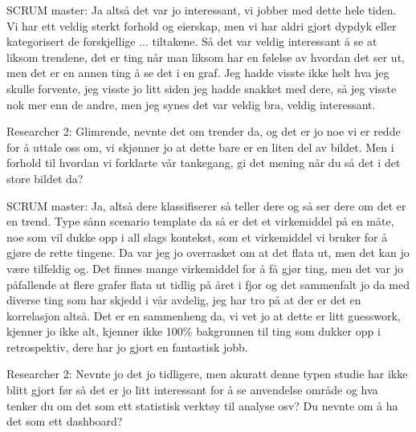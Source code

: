 SCRUM master: Ja altså det var jo interessant, vi jobber med dette hele tiden. Vi har ett veldig sterkt forhold og eierskap, men vi har aldri gjort dypdyk eller kategorisert de forskjellige ... tiltakene. Så det var veldig interessant å se  at liksom trendene, det er ting når man liksom har en følelse av hvordan det ser ut, men det er en annen ting å se det i en graf. Jeg hadde visste ikke helt hva jeg skulle forvente, jeg visste jo litt siden jeg hadde snakket med dere, så jeg visste nok mer enn de andre, men jeg synes det var veldig bra, veldig interessant.

Researcher 2: Glimrende, nevnte det om trender da, og det er jo noe vi er redde for å uttale oss om, vi skjønner jo at dette bare er en liten del av bildet. Men i forhold til hvordan vi forklarte vår tankegang, gi det mening når du så det i det store bildet da?

SCRUM master: Ja, altså dere klassifiserer så teller dere og så ser dere om det er en trend. Type sånn scenario template da så er det et virkemiddel på en måte, noe som vil dukke opp i all slags kontekst, som et virkemiddel vi bruker for å gjøre de rette tingene. Da var jeg jo overrasket om at det flata ut, men det kan jo være tilfeldig og. Det finnes mange virkemiddel for å få gjør ting, men det var jo påfallende at flere grafer flata ut tidlig på året i fjor og det sammenfalt jo da med diverse ting som har skjedd i vår avdelig, jeg har tro på at der er det en korrelasjon altså. Det er en sammenheng da, vi vet jo at dette er litt guesswork, kjenner jo ikke alt, kjenner ikke 100\% bakgrunnen til ting som dukker opp i retrospektiv, dere har jo gjort en fantastisk jobb.

Researcher 2: Nevnte jo det jo tidligere, men akuratt denne typen studie har ikke blitt gjort før så det er jo litt interessant for å se anvendelse område og hva tenker du om det som ett statistisk verktøy til analyse osv? Du nevnte om å ha det som ett dashboard?

